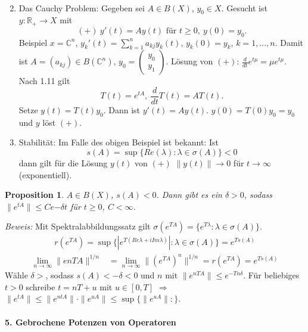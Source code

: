 \documentclass[12pt]{extreport} %
\newtheorem{Prop}[Satz]{Proposition}
\numberwithin{equation}{section}
\newcommand{\C}{\mathbb{C}} %
\newcommand{\R}{\mathbb{R}} %
\newcommand{\m}{\cdot}
\newcommand{\Bew}{\emph{Beweis: }}
\begin{document}
\begin{enumerate}
\begin{align*}
		\end{align*}
		\item Das Cauchy Problem: Gegeben sei $A\in B(X)$, $y_0\in X$. Gesucht ist $y\colon \R_+\rightarrow X$ mit 
		$$(+) ~y'(t) = Ay(t) \text{ für } t\geq 0,~ y(0) = y_0.$$
		Beispiel $x = \C^n$, $y_k'(t) = \sum_{k = 1}^{n} a_{kj}y_k(t)$, $y_k(0) = y_k$, $k = 1,...,n$. Damit ist $A = (a_{kj}) \in B(\C^n)$, $y_0=\left(\begin{matrix}
		y_0\\
		y_1
		\end{matrix} \right)$. Lösung von $(+)$: $\frac{d}{dt}e^{t\mu} = \mu e^{t\mu}$. Nach 1.11 gilt 
		$$T(t) = e^{tA}, ~ \frac{d}{dt}T(t) = AT(t).$$
		Setze $y(t) = T(t)y_0$. Dann ist $y'(t) = Ay(t)$. $y(0) = T(0) y_0 = y_0$ und $y$ löst $(+)$.\\
		\item Stabilität: Im Falle des obigen Beispiel ist bekannt: Ist
		$$s(A) = \sup \{Re(\lambda)\colon \lambda \in \sigma(A) \}<0$$
		dann gilt für die Lösung $y(t)$ von $(+)$ $\|y(t)\|\rightarrow 0$ für $t\rightarrow \infty$ (exponentiell).
	\end{enumerate}
	
	\begin{Prop}
		$A\in B(X)$, $s(A)<0$. Dann gibt es ein $\delta>0$, sodass $\|e^{tA}\|\leq Ce{-\delta t}$ für $t\geq 0$, $C<\infty$.
	\end{Prop}
	
	\Bew Mit Spektralabbildungssatz gilt $\sigma(e^{TA}) = \{e^{T\lambda}\colon \lambda \in \sigma(A) \}$.
	\begin{align*}
		r(e^{TA}) = \sup \{|e^{T(Re\lambda + iIm \lambda)}|\colon \lambda \in \sigma(A) \} = e^{Ts(A)}
	\end{align*}
	\begin{align*}
		\lim\limits_{n\rightarrow \infty} \|e{nTA}\|^{1/n} &= \lim\limits_{n\rightarrow\infty} \|(e^{TA})^n\|^{1/n} = r(e^{TA})
		= e^{Ts(A)}
	\end{align*}
	Wähle $\delta>$, sodass $s(A)<-\delta<0$ und $n$ mit $\| e^{nTA}\|\leq e^{-Tn\delta}$. Für beliebiges $t>0$ schreibe $t = nT + u$ mit $u\in [0,T]$ $\Rightarrow$ $\|e^{tA}\| \leq \|e^{ntA}\|\m \|e^{uA}\|\leq \sup\{\|e^{uA}\|\colon  \}$.
	
	\paragraph{5. Gebrochene Potenzen von Operatoren}
	
\end{document}
